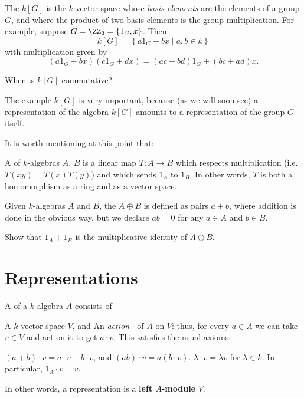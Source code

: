 \begin{example}
	The  $k[G]$ is the $k$-vector space
	whose \emph{basis elements} are the elements of a group $G$,
	and where the product of two basis elements is the group multiplication.
	For example, suppose $G = \Zc 2 = \{1_G, x\}$.
	Then
	\[ k[G] = \left\{ a1_G + bx \mid a,b \in k \right\} \]
	with multiplication given by
	\[ (a1_G + bx)(c1_G+dx) = (ac+bd)1_G + (bc+ad)x. \]
\end{example}
\begin{ques}
	When is $k[G]$ commutative?
\end{ques}
The example $k[G]$ is very important,
because (as we will soon see) a representation of the algebra $k[G]$
amounts to a representation of the group $G$ itself.

It is worth mentioning at this point that:
\begin{definition}
	A  of $k$-algebras $A$, $B$ is a
	linear map $T : A \to B$ which respects multiplication
	(i.e.\ $T(xy) = T(x)T(y)$) and which sends $1_A$ to $1_B$.
	In other words, $T$ is both a homomorphism as a ring and as a vector space.
\end{definition}
\begin{definition}
	Given $k$-algebras $A$ and $B$, the  $A \oplus B$
	is defined as pairs $a + b$, where addition is done in the obvious way,
	but we declare $ab = 0$ for any $a \in A$ and $b \in B$.
\end{definition}
\begin{ques}
	Show that $1_A + 1_B$ is the multiplicative identity of $A \oplus B$.
\end{ques}

\section{Representations}

\begin{definition}
	A  of a $k$-algebra $A$ consists of
	\begin{enumerate}[(i)]
		\ii A $k$-vector space $V$, and
		\ii An \emph{action} $\cdot$ of $A$ on $V$: thus, for every $a \in A$
		we can take $v \in V$ and act on it to get $a \cdot v$.
		This satisfies the usual axioms:
		\begin{itemize}
			\ii $(a+b) \cdot v = a \cdot v + b \cdot v$,
			and $(ab) \cdot v = a(b \cdot v)$.
			\ii $\lambda \cdot v = \lambda v$ for $\lambda \in k$.
			In particular, $1_A \cdot v = v$.
		\end{itemize}
	\end{enumerate}
	In other words, a representation is a \textbf{left $A$-module} $V$.
\end{definition}

